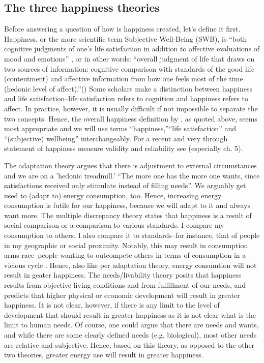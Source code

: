 \documentclass[10pt, letterpaper]{article}
\begin{document}
\begin{spacing}{1.4}
\section{The three happiness theories}

Before answering a question of how is happiness created, let's define it first. 
  Happiness, or the more scientific term Subjective Well-Being (SWB), is ``both cognitive judgments of one's life
satisfaction in addition to affective evaluations of mood and
emotions'' \citep[p. 142]{steel08},  or in other words: ``overall judgment of life that draws on two sources of information:
  cognitive comparison with standards of the good life (contentment) and
  affective information from how one feels most of the time (hedonic
  level of affect).''(\citep[p. 2]{veenhoven08})
 Some scholars make a
  distinction between happiness and life satisfaction--life
  satisfaction refers to cognition and happiness refers to affect. In practice,
  however, it is usually difficult  if not impossible to separate the two
  concepts.  Hence, the overall happiness definition by 
   \citet{veenhoven08}, as quoted above,  seems most appropriate and we will use terms
   ``happiness,''``life satisfaction'' and ``(subjective) wellbeing'' interchangeably.  For a recent and very through statement of
happiness measure validity and reliability see \citet{diener09}
(especially ch. 5). 

The adaptation theory \citep{brickman78cj} argues that there is
adjustment to external circumstances and we are on a 'hedonic
treadmill.' ``The more one has the more one wants, since satisfactions
received only stimulate instead of filling needs''\citep{durkheim50}. 
We arguably get used to (adapt to) energy consumption, too. Hence, increasing
energy consumption is futile for our happiness, because we will adapt to it and
always want more.
%
The  multiple discrepancy theory  \citep{michalos85} states that
happiness is a result of social comparison or a comparison to various
standards.  I compare my consumption to others. I also compare
it to standards--for instance, that of people in my geographic or social
proximity. Notably, this may result in consumption arms race--people wanting to
outcompete others in terms of consumption in a vicious
cycle \citep{frank12}. Hence, also like  per adaptation theory, energy consumtion
will not result in geater happiness.  
%
  The needs/livability theory \citep{veenhoven95, veenhoven14b} posits that
  happiness results from objective living conditions and from
  fulfillment of our needs, and predicts that higher physical or economic
  development will result in greater happiness. It is not clear, however, if
  there is any limit to the level of development that should result in greater
  happiness as it is not clear what is the limit to human needs. Of course, one
  could argue that there are needs and wants, and while there are some clearly
  defined needs (e.g. biological), most other needs are relative and
  subjective. Hence, based on this theory, as opposed to the other two theories,
  greater energy use will result in greater happiness.
  


\end{spacing}
\end{document}
